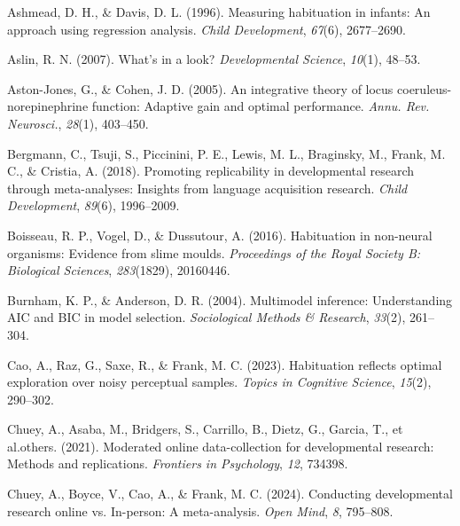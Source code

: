 \documentclass[10pt, letterpaper]{article}
\newenvironment{CSLReferences}%
  {}%
  {\par}
\begin{document}
\hypertarget{refs}{}
\begin{CSLReferences}{1}{0}
\leavevmode{}%
Ashmead, D. H., \& Davis, D. L. (1996). Measuring habituation in
infants: An approach using regression analysis. \emph{Child
Development}, \emph{67}(6), 2677--2690.

\leavevmode{}%
Aslin, R. N. (2007). What's in a look? \emph{Developmental Science},
\emph{10}(1), 48--53.

\leavevmode{}%
Aston-Jones, G., \& Cohen, J. D. (2005). An integrative theory of locus
coeruleus-norepinephrine function: Adaptive gain and optimal
performance. \emph{Annu. Rev. Neurosci.}, \emph{28}(1), 403--450.

\leavevmode{}%
Bergmann, C., Tsuji, S., Piccinini, P. E., Lewis, M. L., Braginsky, M.,
Frank, M. C., \& Cristia, A. (2018). Promoting replicability in
developmental research through meta-analyses: Insights from language
acquisition research. \emph{Child Development}, \emph{89}(6),
1996--2009.

\leavevmode{}%
Boisseau, R. P., Vogel, D., \& Dussutour, A. (2016). Habituation in
non-neural organisms: Evidence from slime moulds. \emph{Proceedings of
the Royal Society B: Biological Sciences}, \emph{283}(1829), 20160446.

\leavevmode{}%
Burnham, K. P., \& Anderson, D. R. (2004). Multimodel inference:
Understanding AIC and BIC in model selection. \emph{Sociological Methods
\& Research}, \emph{33}(2), 261--304.

\leavevmode{}%
Cao, A., Raz, G., Saxe, R., \& Frank, M. C. (2023). Habituation reflects
optimal exploration over noisy perceptual samples. \emph{Topics in
Cognitive Science}, \emph{15}(2), 290--302.

\leavevmode{}%
Chuey, A., Asaba, M., Bridgers, S., Carrillo, B., Dietz, G., Garcia, T.,
et al.others. (2021). Moderated online data-collection for developmental
research: Methods and replications. \emph{Frontiers in Psychology},
\emph{12}, 734398.

\leavevmode{}%
Chuey, A., Boyce, V., Cao, A., \& Frank, M. C. (2024). Conducting
developmental research online vs. In-person: A meta-analysis. \emph{Open
Mind}, \emph{8}, 795--808.


\end{CSLReferences}
\end{document}

